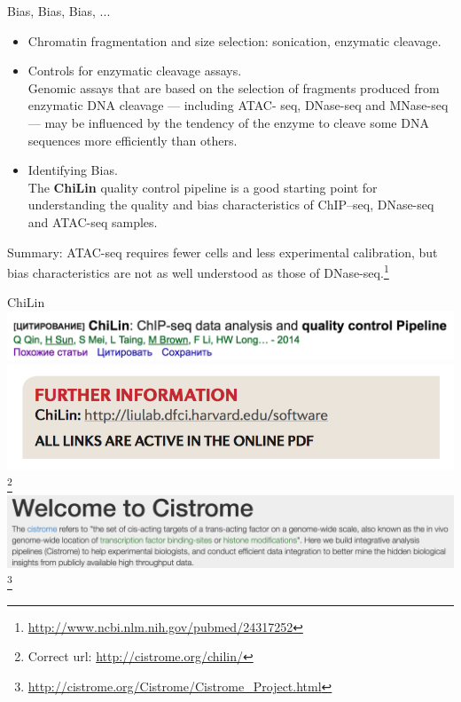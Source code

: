 \documentclass{beamer}
\begin{document}
\begin{frame}{Bias, Bias, Bias, ...}
\begin{itemize}
\item Chromatin fragmentation and size selection: sonication, enzymatic cleavage. 
\item Controls for enzymatic cleavage assays. \\
\small{Genomic assays that are based on the selection of fragments produced from enzymatic DNA cleavage — including ATAC- seq, DNase-seq and MNase-seq — may be influenced by the tendency of the enzyme to cleave some DNA sequences more efficiently than others.}
\item Identifying Bias. \\
\small{The \textbf{ChiLin} quality control pipeline is a good starting point for understanding the quality and bias characteristics of ChIP–seq, DNase-seq and ATAC-seq samples. }
\end{itemize}
Summary: ATAC-seq requires fewer cells and less experimental calibration, but bias characteristics are not as well
understood as those of DNase-seq.\footnote{\url{http://www.ncbi.nlm.nih.gov/pubmed/24317252}}
\end{frame}

\begin{frame}{ChiLin}
\includegraphics[width=\linewidth]{chilin.png}\\
\includegraphics[width=\linewidth]{chilin404.png}\footnote{Correct url: \url{http://cistrome.org/chilin/}}\\
\includegraphics[width=\linewidth]{cistrome.png}\footnote{\url{http://cistrome.org/Cistrome/Cistrome_Project.html}}
\end{frame}
\end{document}

